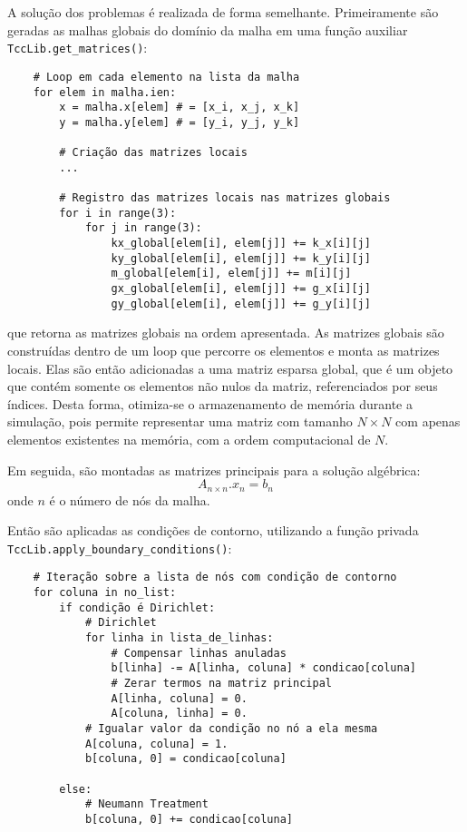 A solução dos problemas é realizada de forma semelhante.
Primeiramente são geradas as malhas globais do domínio da malha em uma função auxiliar \verb|TccLib.get_matrices()|:
\begin{verbatim}
    # Loop em cada elemento na lista da malha
    for elem in malha.ien:
        x = malha.x[elem] # = [x_i, x_j, x_k]
        y = malha.y[elem] # = [y_i, y_j, y_k]

        # Criação das matrizes locais
        ...

        # Registro das matrizes locais nas matrizes globais
        for i in range(3):
            for j in range(3):
                kx_global[elem[i], elem[j]] += k_x[i][j]
                ky_global[elem[i], elem[j]] += k_y[i][j]
                m_global[elem[i], elem[j]] += m[i][j]
                gx_global[elem[i], elem[j]] += g_x[i][j]
                gy_global[elem[i], elem[j]] += g_y[i][j]
\end{verbatim}
que retorna as matrizes globais na ordem apresentada.
As matrizes globais são construídas dentro de um loop que percorre os elementos e monta as matrizes locais.
Elas são então adicionadas a uma matriz esparsa global, que é um objeto que contém somente os elementos não nulos da matriz, referenciados por seus índices.
Desta forma, otimiza-se o armazenamento de memória durante a simulação, pois permite representar uma matriz com tamanho $N\times N$ com apenas elementos existentes na memória, com a ordem computacional de $N$.

Em seguida, são montadas as matrizes principais para a solução algébrica:
\begin{equation}
    A_{n\times n}.x_{n} = b_{n}
\end{equation}
onde $n$ é o número de nós da malha.

Então são aplicadas as condições de contorno, utilizando a função privada \verb|TccLib.apply_boundary_conditions()|:
\begin{verbatim}
    # Iteração sobre a lista de nós com condição de contorno
    for coluna in no_list:
        if condição é Dirichlet:
            # Dirichlet
            for linha in lista_de_linhas:
                # Compensar linhas anuladas
                b[linha] -= A[linha, coluna] * condicao[coluna]
                # Zerar termos na matriz principal
                A[linha, coluna] = 0.
                A[coluna, linha] = 0.
            # Igualar valor da condição no nó a ela mesma
            A[coluna, coluna] = 1.
            b[coluna, 0] = condicao[coluna]

        else:
            # Neumann Treatment
            b[coluna, 0] += condicao[coluna]
\end{verbatim}

